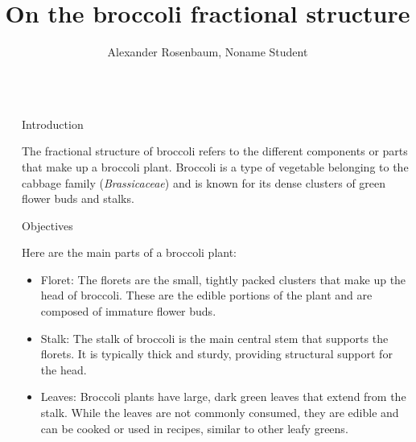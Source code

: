 \documentclass[]{beamer}
\title{On the broccoli fractional structure}
\author{Alexander Rosenbaum, Noname Student}
\begin{document}
\nocite{*} %

\begin{frame}[t]
    \begin{columns}[t] %
     
    \begin{column}{\lrmargin}\end{column} %
    
    \begin{column}{\onecolwid} %
     
    
    \begin{block}{Introduction}
    
    The fractional structure of broccoli refers to the different components or parts that make up a broccoli plant. Broccoli is a type of vegetable belonging to the cabbage family (\textit{Brassicaceae}) and is known for its dense clusters of green flower buds and stalks. 
    
    \end{block}
    
    
    \begin{alertblock}{Objectives}
    
    Here are the main parts of a broccoli plant:
    \begin{itemize}
        \item Floret: The florets are the small, tightly packed clusters that make up the head of broccoli. These are the edible portions of the plant and are composed of immature flower buds.

    	\item  Stalk: The stalk of broccoli is the main central stem that supports the florets. It is typically thick and sturdy, providing structural support for the head.

    	\item Leaves: Broccoli plants have large, dark green leaves that extend from the stalk. While the leaves are not commonly consumed, they are edible and can be cooked or used in recipes, similar to other leafy greens.


\end{itemize}
\end{alertblock}
\end{column}
\end{columns}
\end{frame}
\end{document}
